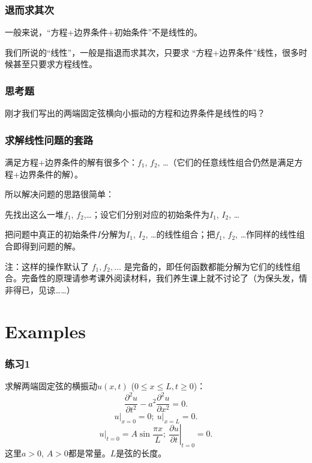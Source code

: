 \documentclass[CJK]{beamer}
\begin{document}
\begin{frame}
  \frametitle{退而求其次}
一般来说，{\blue “方程+边界条件+初始条件”不是线性}的。

\skipline

我们所说的“线性”，一般是指退而求其次，只要求 {\blue “方程+边界条件”线性}，很多时候甚至只要求{\blue 方程线性}。

\end{frame}


\begin{frame}
  \frametitle{思考题}

  刚才我们写出的两端固定弦横向小振动的方程和边界条件是线性的吗？

\end{frame}


\begin{frame}
  \frametitle{求解线性问题的套路}

  满足方程+边界条件的解有很多个：$f_1$, $f_2$, \ldots （它们的任意线性组合仍然是满足方程+边界条件的解）。

  所以解决问题的思路很简单：

  \bitem
\item{先找出这么一堆$f_1$, $f_2$,\ldots；设它们分别对应的初始条件为$I_1$, $I_2$, \ldots}
\item{把问题中真正的初始条件$I$分解为$I_1$, $I_2$, \ldots 的线性组合；把$f_1$, $f_2$, \ldots 作同样的线性组合即得到问题的解。}
  \eitem

  \skiplines

  {\scriptsize 注：这样的操作默认了 $f_1,f_2,\ldots$ 是完备的，即任何函数都能分解为它们的线性组合。完备性的原理请参考课外阅读材料，我们养生课上就不讨论了（为保头发，情非得已，见谅……）}
\end{frame}

\section{Examples}

\begin{frame}
  \frametitle{练习1}
  求解两端固定弦的横振动$u(x, t)$ ($0\le x\le L, t\ge 0$)：
  $$\frac{\partial^2u}{\partial t^2} - a^2\frac{\partial^2u}{\partial x^2} = 0 .$$
  $$ \left.u\right\vert_{x=0} = 0;\ \left.u\right\vert_{x=L} = 0.$$
  $$ \left.u\right\vert_{t=0} = A\sin\frac{\pi x}{L};\ \left.\frac{\partial u}{\partial t}\right\vert_{t=0} = 0.$$
  这里$a>0$, $A>0$都是常量。$L$是弦的长度。
\end{frame}
\end{document}

